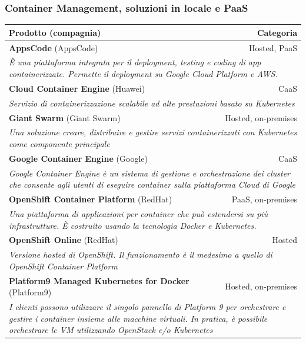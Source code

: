 \documentclass[12pt, a4paper]{report}
\begin{document}
\subsubsection{Container Management, soluzioni in locale e PaaS}
\begin{table}[ht]
  \small
  \begin{center}
  \begin{tabularx}{\textwidth}{|lr|}
    \hline
    \textbf{Prodotto} (compagnia) & \textbf{Categoria}\\
    \hline
    \textbf{AppsCode} (AppsCode)&Hosted, PaaS\\
    \multicolumn{2}{|X|}{\textit{È una piattaforma integrata per il deployment, testing e coding di app containerizzate. Permette il deployment su Google Cloud Platform e AWS.}}\\
    \hline
    \textbf{Cloud Container Engine} (Huawei)&CaaS\\
    \multicolumn{2}{|X|}{\textit{Servizio di containerizzazione scalabile ad alte prestazioni basato su Kubernetes}}\\
    \hline
    \textbf{Giant Swarm} (Giant Swarm)&Hosted, on-premises\\
    \multicolumn{2}{|X|}{\textit{Una soluzione creare, distribuire e gestire servizi containerizzati con Kubernetes come componente principale}}\\
    \hline
    \textbf{Google Container Engine} (Google)&CaaS\\
    \multicolumn{2}{|X|}{\textit{Google Container Engine è un sistema di gestione e orchestrazione dei cluster che consente agli utenti di eseguire container sulla piattaforma Cloud di Google}}\\
    \hline
    \textbf{OpenShift Container Platform} (RedHat)&PaaS, on-premises\\
    \multicolumn{2}{|X|}{\textit{Una piattaforma di applicazioni per container che può estendersi su più infrastrutture. È costruito usando la tecnologia Docker e Kubernetes.}}\\
    \hline
    \textbf{OpenShift Online} (RedHat)&Hosted\\
    \multicolumn{2}{|X|}{\textit{Versione hosted di OpenShift. Il funzionamento è il medesimo a quello di OpenShift Container Platform}}\\
    \hline
    \textbf{Platform9 Managed Kubernetes for Docker} (Platform9)&Hosted, on-premises\\
    \multicolumn{2}{|X|}{\textit{I clienti possono utilizzare il singolo pannello di Platform 9 per orchestrare e gestire i container insieme alle macchine virtuali. In pratica, è possibile orchestrare le VM utilizzando OpenStack e/o Kubernetes}}\\
    \hline
  \end{tabularx}
  \end{center}
\end{table}
\newpage
\end{document}
